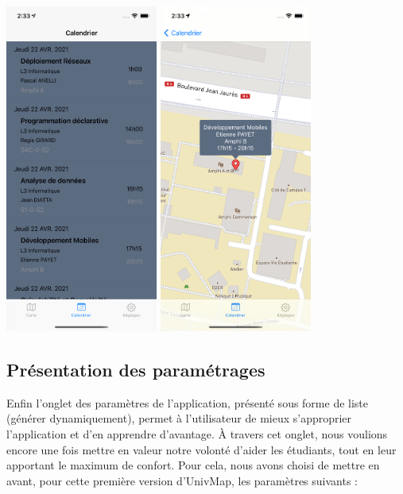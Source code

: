 \documentclass{article}
\begin{document}
\begin{center}
    \includegraphics[width=50mm, scale=0.5]{calendar.png}
    \includegraphics[width=50mm, scale=0.5]{calendar_position.png}
\end{center}



\newpage %



\subsection{Présentation des paramétrages}
Enfin l'onglet des paramètres de l'application, présenté sous forme de liste (générer dynamiquement), permet à l'utilisateur
de mieux s'approprier l'application et d'en apprendre d'avantage. À travers cet onglet, nous voulions encore une fois
mettre en valeur notre volonté d'aider les étudiants, tout en leur apportant le maximum de confort. Pour cela, nous avons
choisi de mettre en avant, pour cette première version d'UnivMap, les paramètres suivants :\\
\end{document}
